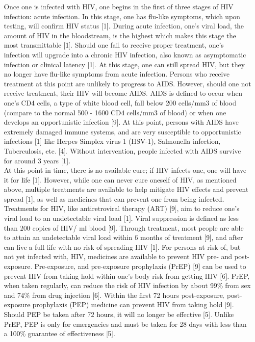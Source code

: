 \documentclass[a4paper, final, 12pt]{article}
\numberwithin{equation}{section}
\begin{document}
Once one is infected with HIV, one begins in the first of three stages of HIV infection: acute infection. In this stage, one has flu-like symptoms, which upon testing, will confirm HIV status [1]. During acute infection, one's viral load, the amount of HIV in the bloodstream, is the highest which makes this stage the most transmittable [1]. Should one fail to receive proper treatment, one's infection will upgrade into a chronic HIV infection, also known as asymptomatic infection or clinical latency [1]. At this stage, one can still spread HIV, but they no longer have flu-like symptoms from acute infection. Persons who receive treatment at this point are unlikely to progress to AIDS. However, should one not receive treatment, their HIV will become AIDS. AIDS is defined to occur when one's CD4 cells, a type of white blood cell, fall below 200 cells/mm3 of blood (compare to the normal 500 - 1600 CD4 cells/mm3 of blood) or when one develops an opportunistic infection [9]. At this point, persons with AIDS have extremely damaged immune systems, and are very susceptible to opportunistic infections [1] like Herpes Simplex virus 1 (HSV-1), Salmonella infection, Tuberculosis, etc. [4]. Without intervention, people infected with AIDS survive for around 3 years [1]. \\

At this point in time, there is no available cure; if HIV infects one, one will have it for life [1]. However, while one can never cure oneself of HIV, as mentioned above, multiple treatments are available to help mitigate HIV effects and prevent spread [1], as well as medicines that can prevent one from being infected. Treatments for HIV, like antiretroviral therapy (ART) [9], aim to reduce one's viral load to an undetectable viral load [1]. Viral suppression is defined as less than 200 copies of HIV/ ml blood [9]. Through treatment, most people are able to attain an undetectable viral load within 6 months of treatment [9], and after can live a full life with no risk of spreading HIV [1]. For persons at risk of, but not yet infected with, HIV, medicines are available to prevent HIV pre- and post-exposure. Pre-exposure, and pre-exposure prophylaxis (PrEP) [9] can be used to prevent HIV from taking hold within one's body risk from getting HIV [6]. PrEP, when taken regularly, can reduce the risk of HIV infection by about 99\% from sex and 74\% from drug injection [6]. Within the first 72 hours post-exposure, post-exposure prophylaxis (PEP) medicine can prevent HIV from taking hold [9]. Should PEP be taken after 72 hours, it will no longer be effective [5]. Unlike PrEP, PEP is only for emergencies and must be taken for 28 days with less than a 100\% guarantee of effectiveness [5].\\
\end{document}
